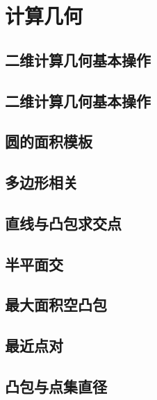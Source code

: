 \documentclass[landscape, twocolumn, 8pt, a4paper, twoside]{extarticle}
\begin{document}
\tableofcontents
\newpage
\section{计算几何}
  \subsection{二维计算几何基本操作}
  
  
  \subsection{二维计算几何基本操作}
  

  \subsection{圆的面积模板}
  

  \subsection{多边形相关}
  

  \subsection{直线与凸包求交点}
  

  \subsection{半平面交}
  

  \subsection{最大面积空凸包}
  

  \subsection{最近点对}
  

  \subsection{凸包与点集直径}
  
\end{document}
